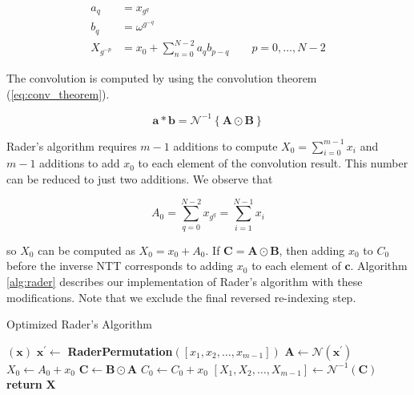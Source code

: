 \documentclass[lettersize,journal]{IEEEtran}
\begin{document}
\begin{align}
a_q &= x_{g^q} \\
b_q &= \omega^{g^{-q}} \\
X_{g^{-p}} &= x_0 + \sum_{n=0}^{N-2} a_q b_{p-q} \qquad p=0,\ldots,N-2
\end{align}

The convolution is computed by using the convolution theorem (\ref{eq:conv_theorem}).

\begin{equation}
\label{eq:conv_theorem}
\mathbf{a} \ast \mathbf{b} = \mathcal{N}^{-1}\left\{\mathbf{A}\odot \mathbf{B}\right\}
\end{equation}

Rader's algorithm requires $m-1$ additions to compute $X_0 = \sum_{i=0}^{m-1} x_i$ and $m-1$ additions to add $x_0$ to each element of the convolution result. This number can be reduced to just two additions. We observe that

\begin{equation}
A_0 = \sum_{q=0}^{N-2} x_{g^q} = \sum_{i=1}^{N-1} x_i
\end{equation}

so $X_0$ can be computed as $X_0 = x_0 + A_0$. If $\mathbf{C} = \mathbf{A} \odot \mathbf{B}$, then adding $x_0$ to $C_0$ before the inverse NTT corresponds to adding $x_0$ to each element of $\mathbf{c}$. Algorithm \ref{alg:rader} describes our implementation of Rader's algorithm with these modifications. Note that we exclude the final reversed re-indexing step.

\begin{algorithm}[H]
\caption{Optimized Rader's Algorithm}\label{alg:rader}
\begin{algorithmic}
\STATE 
{}$(\mathbf{x})$
\STATE \hspace{0.5cm}$ \mathbf{x^\prime} \gets$ {\textbf{RaderPermutation}}$([x_1, x_2,\ldots, x_{m-1}]) $
\STATE \hspace{0.5cm}$ \mathbf{A} \gets \mathcal{N}(\mathbf{x^\prime}) $
\STATE \hspace{0.5cm}$ X_0 \gets A_0 + x_0 $
\STATE \hspace{0.5cm}$ \mathbf{C} \gets \mathbf{B} \odot \mathbf{A} $
\STATE \hspace{0.5cm}$ C_0 \gets C_0 + x_0 $
\STATE \hspace{0.5cm}$[X_1, X_2,\ldots, X_{m-1}] \gets \mathcal{N}^{-1}\left(\mathbf{C}\right)$
\STATE \hspace{0.5cm}\textbf{return}  $\mathbf{X}$
\STATE 
\end{algorithmic}
\end{algorithm}
\end{document}
